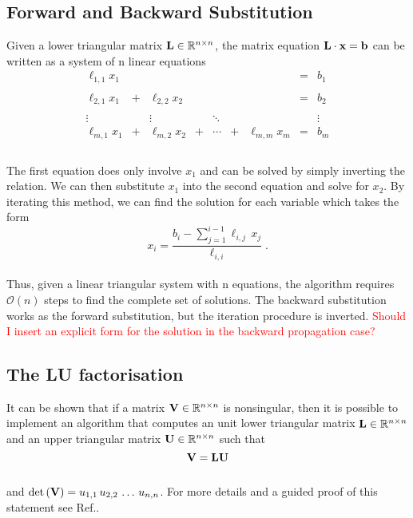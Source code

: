 \subsection*{Forward and Backward Substitution}
Given a lower triangular matrix $\mathbf{L} \in \mathbb{R}^{n \times n}$, the matrix equation $\mathbf{L} \cdot \mathbf{x} = \mathbf{b}$ can be written as a system of n linear equations
\\
\begin{equation*}
\begin{matrix}
  \ell_{1,1} x_1 &   &                &   &        &   &                & = &    b_1 \\\\
  \ell_{2,1} x_1 & + & \ell_{2,2} x_2 &   &        &   &                & = &    b_2 \\\\
          \vdots &   &         \vdots &   & \ddots &   &                &   & \vdots \\
  \ell_{m,1} x_1 & + & \ell_{m,2} x_2 & + & \dotsb & + & \ell_{m,m} x_m & = &    b_m \\
\end{matrix}
\end{equation*}
\\
The first equation does only involve $x_1$ and can be solved by simply inverting the relation. We can then substitute $x_1$ into the second equation and solve for $x_2$. By iterating this method, we can find the solution for each variable which takes the form
\\
\begin{equation*}
    x_i = \frac{b_i - \sum_{j=1}^{i-1}\ell_{i,j}\,x_j}{\ell_{i,i}} \;.
\end{equation*}
\\
Thus, given a linear triangular system with n equations, the algorithm requires $\mathcal{O}(n)$ steps to find the complete set of solutions. The backward substitution works as the forward substitution, but the iteration procedure is inverted. \textcolor{red}{Should I insert an explicit form for the solution in the backward propagation case?}

\subsection*{The LU factorisation}
It can be shown that if a matrix $\mathbf{V} \in \mathbb{R}^{n\times n}$ is nonsingular, then it is possible to implement an algorithm that computes an unit lower triangular matrix $\mathbf{L} \in \mathbb{R}^{n\times n}$ and an upper triangular matrix $\mathbf{U} \in  \mathbb{R}^{n\times n}$ such that 
\\
\begin{equation*}
    \mathbf{V} = \mathbf{L} \mathbf{U} 
\end{equation*}
\\
and $\det\left( \mathbf{V} \right) = u_{1,1} \, u_{2,2} \, \dots \, u_{n,n} $. For more details and a guided proof of this statement see Ref.\cite{GoluVanl96}. 


